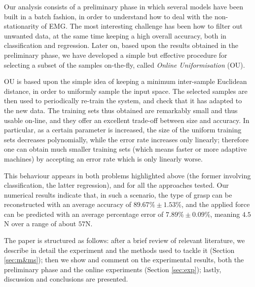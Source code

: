 Our analysis consists of a preliminary phase in which several models
have been built in a batch fashion, in order to understand how to deal
with the non-stationarity of EMG. The most interesting challenge has
been how to filter out unwanted data, at the same time keeping a high
overall accuracy, both in classification and regression. Later on,
based upon the results obtained in the preliminary phase, we have
developed a simple but effective procedure for selecting a subset of
the samples on-the-fly, called \emph{Online Uniformisation} (OU).

OU is based upon the simple idea of keeping a minimum inter-sample
Euclidean distance, in order to uniformly sample the input space. The
selected samples are then used to periodically re-train the system,
and check that it has adapted to the new data. The training sets thus
obtained are remarkably small and thus usable on-line, and they offer
an excellent trade-off between size and accuracy. In particular, as a
certain parameter is increased, the size of the uniform training sets
decreases polynomially, while the error rate increases only
linearly; therefore one can obtain much smaller training sets (which
means faster or more adaptive machines) by accepting an error rate
which is only linearly worse.

This behaviour appears in both problems highlighted above (the former
involving classification, the latter regression), and for all the
approaches tested. Our numerical results indicate that, in such a
scenario, the type of grasp can be reconstructed with an average
accuracy of $89.67\% \pm 1.53\%$, and the applied force can be
predicted with an average percentage error of $7.89\% \pm 0.09\%$,
meaning $4.5$N over a range of about $57$N.

The paper is structured as follows: after a brief review of relevant
literature, we describe in detail the experiment and the methods used
to tackle it (Section \ref{sec:m&ms}); then we show and comment on the
experimental results, both the preliminary phase and the online
experiments (Section \ref{sec:exp}); lastly, discussion and
conclusions are presented.
